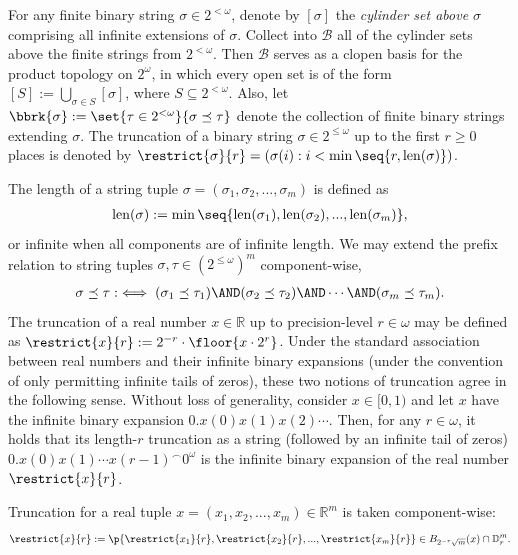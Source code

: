 For any finite binary string $\sigma \in 2^{<\omega}$, denote by $[\sigma]$ the \textit{cylinder set above $\sigma$} comprising all infinite extensions of $\sigma$. Collect into $\mathcal{B}$ all of the cylinder sets above the finite strings from $2^{<\omega}$. Then $\mathcal{B}$ serves as a clopen basis for the product topology on $2^\omega$, in which every open set is of the form $[S] := \bigcup_{\sigma \in S} [\sigma]$, where $S \subseteq 2^{<\omega}$. Also, let $\bbrk{\sigma} := \set{\tau \in 2^{<\omega}}{\sigma \preceq \tau}$ denote the collection of finite binary strings extending $\sigma$. The truncation of a binary string $\sigma \in 2^{\leq \omega}$ up to the first $r \geq 0$ places is denoted by $\restrict{\sigma}{r} = (\sigma(i) : i < \min\seq{r, \operatorname{len}(\sigma)})$. 

The length of a string tuple $\sigma = (\sigma_1, \sigma_2, ..., \sigma_m)$ is defined as 
\begin{align*}
    \operatorname{len}(\sigma) := \min \seq{\operatorname{len}(\sigma_1), \operatorname{len}(\sigma_2), ..., \operatorname{len}(\sigma_m)},
\end{align*}
or infinite when all components are of infinite length. We may extend the prefix relation to string tuples $\sigma, \tau \in (2^{\leq \omega})^m$ component-wise, 
\begin{align*}
    \sigma \preceq \tau :\iff (\sigma_1 \preceq \tau_1) \AND (\sigma_2 \preceq \tau_2) \AND \cdots \AND (\sigma_m \preceq \tau_m).
\end{align*}
The truncation of a real number $x \in \mathbb{R}$ up to precision-level $r \in \omega$ may be defined as $\restrict{x}{r} := 2^{-r} \cdot \floor{x \cdot 2^r}$. Under the standard association between real numbers and their infinite binary expansions (under the convention of only permitting infinite tails of zeros), these two notions of truncation agree in the following sense. Without loss of generality, consider $x \in [0, 1)$ and let $x$ have the infinite binary expansion $0.x(0)x(1)x(2) \cdots$. Then, for any $r \in \omega$, it holds that its length-$r$ truncation as a string (followed by an infinite tail of zeros) $0.x(0) x(1) \cdots x(r - 1)^\smallfrown 0^\omega$ is the infinite binary expansion of the real number $\restrict{x}{r}$. 

Truncation for a real tuple $x = (x_1, x_2, ..., x_m) \in \mathbb{R}^m$ is taken component-wise:
\begin{align*}
    \restrict{x}{r} := \p{\restrict{x_1}{r}, \restrict{x_2}{r}, ..., \restrict{x_m}{r}} \in B_{2^{-r} \sqrt{m}}(x) \cap \mathbb{D}_r^m.
\end{align*}

